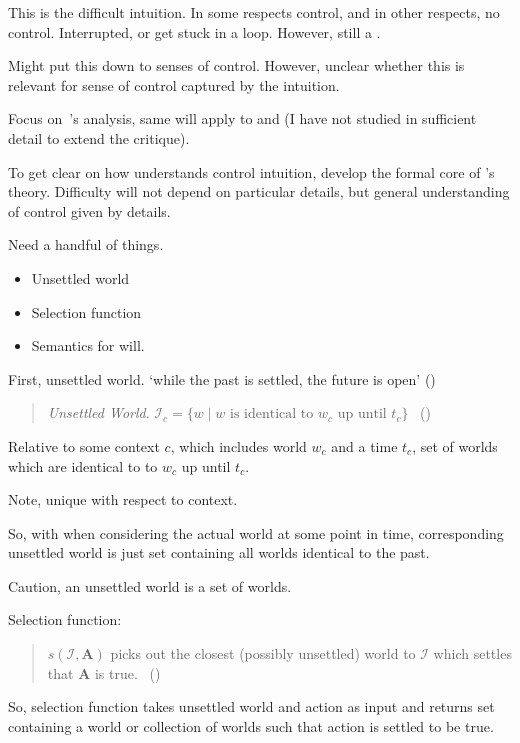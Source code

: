 \begin{note}
  This is the difficult intuition.
  In some respects control, and in other respects, no control.
  Interrupted, or get stuck in a loop.
  However, still a \fc{}.

  Might put this down to senses of control.
  However, unclear whether this is relevant for sense of control captured by the intuition.

  Focus on~\cite{Boylan:2020aa}'s analysis, same will apply to \textcite{Mandelkern:2017aa} and \textcite{Schwarz:2020aa} (I have not studied \textcite{Jaster:2020wv} in sufficient detail to extend the critique).
\end{note}

\begin{note}
  To get clear on how \citeauthor{Boylan:2020aa} understands control intuition, develop the formal core of \citeauthor{Boylan:2020aa}'s theory.
  Difficulty will not depend on particular details, but general understanding of control given by details.

  Need a handful of things.
  \begin{itemize}
  \item
    Unsettled world
  \item
    Selection function
  \item
    Semantics for will.
  \end{itemize}

  First, unsettled world.
  `while the past is settled, the future is open' (\citeyear[1]{Boylan:2020aa})

  \begin{quote}
    \emph{Unsettled World}. \(\mathcal{I}_{c} = \{w \mid w\text{ is identical to }w_{c}\text{ up until }t_{c}\}\)%
    \mbox{ }\hfill\mbox{(\citeyear[11]{Boylan:2020aa})}
  \end{quote}
  Relative to some context \(c\), which includes world \(w_{c}\) and a time \(t_{c}\), set of worlds which are identical to to \(w_{c}\) up until \(t_{c}\).

  Note, unique with respect to context.

  So, with when considering the actual world at some point in time, corresponding unsettled world is just set containing all worlds identical to the past.

  Caution, an unsettled world is a set of worlds.

  Selection function:

  \begin{quote}
    \(s(\mathcal{I}, \mathbf{A})\) picks out the closest (possibly unsettled) world to \(\mathcal{I}\) which settles that \(\mathbf{A}\) is true.%
    \mbox{ }\hfill\mbox{(\citeyear[11]{Boylan:2020aa})}
  \end{quote}
  So, selection function takes unsettled world and action as input and returns set containing a world or collection of worlds such that action is settled to be true.


\end{note}
